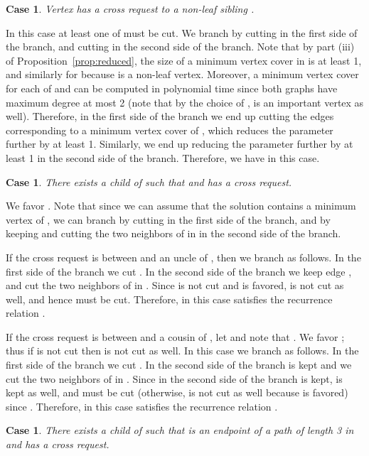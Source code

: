\documentclass[11pt]{article}
\newtheorem{case}[theorem]{Case}
\begin{document}
\begin{case}\label{case:0}
Vertex  has a cross request to a non-leaf sibling .
\end{case}

In this case at least one of  must be cut. We branch by cutting  in the first side of the branch, and cutting  in the second side of the branch. Note that by part (iii) of Proposition~\ref{prop:reduced}, the size of a minimum vertex cover in  is at least 1, and similarly for  because  is a non-leaf vertex. Moreover, a minimum vertex cover for each of  and  can be computed in polynomial time since both graphs have maximum degree at most 2 (note that by the choice of ,  is an important vertex as well). Therefore, in the first side of the branch we end up cutting the edges corresponding to a minimum vertex cover of , which reduces the parameter further by at least 1. Similarly, we end up reducing the parameter further by at least 1 in the second side of the branch. Therefore, we have  in this case.

\begin{case}\label{case:2}
There exists a child  of  such that  and  has a cross request.
\end{case}

We favor . Note that since we can assume that the solution contains a minimum vertex of , we can branch by cutting  in the first side of the branch, and by keeping  and cutting the two neighbors of  in  in the second side of the branch.

If the cross request is between  and an uncle  of , then we branch as follows. In the first side of the branch we cut . In the second side of the branch we keep edge , and cut the two neighbors of  in . Since  is not cut and  is favored,  is not cut as well, and hence  must be cut. Therefore,  in this case satisfies the recurrence relation .

If the cross request is between  and a cousin  of , let  and note that . We favor ; thus if  is not cut then  is not cut as well. In this case we branch as follows. In the first side of the branch we cut . In the second side of the branch  is kept and we cut the two neighbors of  in . Since in the second side of the branch  is kept,  is kept as well, and  must be cut (otherwise,  is not cut as well because  is favored) since . Therefore,  in this case satisfies the recurrence relation .



\begin{case}\label{case:2.5}
There exists a child  of  such that  is an endpoint of a path of length 3 in  and  has a cross request.
\end{case}
\end{document}
